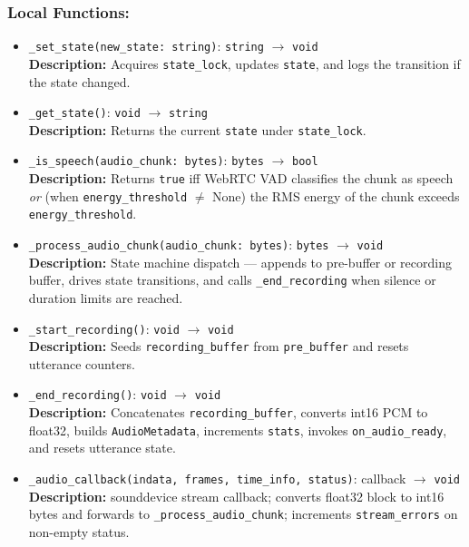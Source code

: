 \documentclass[12pt, titlepage]{article}
\begin{document}
\subsubsection{Local Functions:}
\begin{itemize}
  \item \texttt{\_set\_state(new\_state: string)}: \texttt{string} $\rightarrow$ \texttt{void} \\
  \textbf{Description:} Acquires \texttt{state\_lock}, updates \texttt{state}, and logs the transition if the state changed.

  \item \texttt{\_get\_state()}: \texttt{void} $\rightarrow$ \texttt{string} \\
  \textbf{Description:} Returns the current \texttt{state} under \texttt{state\_lock}.

  \item \texttt{\_is\_speech(audio\_chunk: bytes)}: \texttt{bytes} $\rightarrow$ \texttt{bool} \\
  \textbf{Description:} Returns \texttt{true} iff WebRTC VAD classifies the chunk as speech \emph{or} (when \texttt{energy\_threshold} $\neq$ None) the RMS energy of the chunk exceeds \texttt{energy\_threshold}.

  \item \texttt{\_process\_audio\_chunk(audio\_chunk: bytes)}: \texttt{bytes} $\rightarrow$ \texttt{void} \\
  \textbf{Description:} State machine dispatch — appends to pre-buffer or recording buffer, drives state transitions, and calls \texttt{\_end\_recording} when silence or duration limits are reached.

  \item \texttt{\_start\_recording()}: \texttt{void} $\rightarrow$ \texttt{void} \\
  \textbf{Description:} Seeds \texttt{recording\_buffer} from \texttt{pre\_buffer} and resets utterance counters.

  \item \texttt{\_end\_recording()}: \texttt{void} $\rightarrow$ \texttt{void} \\
  \textbf{Description:} Concatenates \texttt{recording\_buffer}, converts int16 PCM to float32, builds \texttt{AudioMetadata}, increments \texttt{stats}, invokes \texttt{on\_audio\_ready}, and resets utterance state.

  \item \texttt{\_audio\_callback(indata, frames, time\_info, status)}: callback $\rightarrow$ \texttt{void} \\
  \textbf{Description:} sounddevice stream callback; converts float32 block to int16 bytes and forwards to \texttt{\_process\_audio\_chunk}; increments \texttt{stream\_errors} on non-empty status.
\end{itemize}
\end{document}

